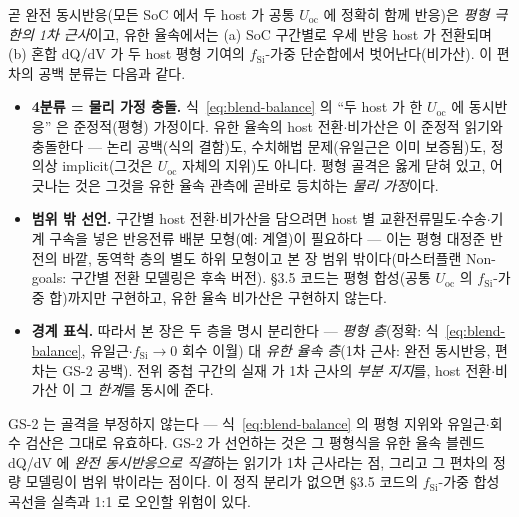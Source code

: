 곧 완전 동시반응(모든 SoC 에서 두 host 가 공통 $U_\mathrm{oc}$ 에 정확히 함께 반응)은 \emph{평형 극한의
1차 근사}이고, 유한 율속에서는 (a) SoC 구간별로 우세 반응 host 가 전환되며 (b) 혼합 dQ/dV 가 두 host
평형 기여의 $f_\mathrm{Si}$-가중 단순합에서 벗어난다(비가산). 이 편차의 공백 분류는 다음과 같다.
\begin{itemize}[leftmargin=1.4em,itemsep=1pt]
\item \textbf{4분류 = 물리 가정 충돌.} 식~\eqref{eq:blend-balance} 의 ``두 host 가 한 $U_\mathrm{oc}$
에 동시반응'' 은 준정적(평형) 가정이다. 유한 율속의 host 전환$\cdot$비가산은 이 준정적 읽기와 충돌한다
--- 논리 공백(식의 결함)도, 수치해법 문제(유일근은 이미 보증됨)도, 정의상 implicit(그것은
$U_\mathrm{oc}$ 자체의 지위)도 아니다. 평형 골격은 옳게 닫혀 있고, 어긋나는 것은 그것을 유한 율속
관측에 곧바로 등치하는 \emph{물리 가정}이다.
\item \textbf{범위 밖 선언.} 구간별 host 전환$\cdot$비가산을 담으려면 host 별 교환전류밀도$\cdot$수송$\cdot$기계
구속을 넣은 반응전류 배분 모형(예: \cite{ai_composite2022} 계열)이 필요하다 --- 이는 평형 대정준 반전의
바깥, 동역학 층의 별도 하위 모형이고 본 장 범위 밖이다(마스터플랜 Non-goals: 구간별 전환 모델링은 후속
버전). §3.5 코드는 평형 합성(공통 $U_\mathrm{oc}$ 의 $f_\mathrm{Si}$-가중 합)까지만 구현하고, 유한 율속
비가산은 구현하지 않는다.
\item \textbf{경계 표식.} 따라서 본 장은 두 층을 명시 분리한다 --- \emph{평형 층}(정확: 식~\eqref{eq:blend-balance},
유일근$\cdot$$f_\mathrm{Si}\to0$ 회수 이월) 대 \emph{유한 율속 층}(1차 근사: 완전 동시반응, 편차는 GS-2
공백). 전위 중첩 구간의 실재\cite{zhan_siox2026} 가 1차 근사의 \emph{부분 지지}를, host 전환$\cdot$비가산
\cite{ai_composite2022,chatzogiannakis_blend2025} 이 그 \emph{한계}를 동시에 준다.
\end{itemize}

\begin{warnbox}
GS-2 는 골격을 부정하지 않는다 --- 식~\eqref{eq:blend-balance} 의 평형 지위와 유일근$\cdot$회수 검산은
그대로 유효하다. GS-2 가 선언하는 것은 그 평형식을 유한 율속 블렌드 dQ/dV 에 \emph{완전 동시반응으로
직결}하는 읽기가 1차 근사라는 점, 그리고 그 편차의 정량 모델링이 범위 밖이라는 점이다. 이 정직 분리가
없으면 §3.5 코드의 $f_\mathrm{Si}$-가중 합성 곡선을 실측과 1:1 로 오인할 위험이 있다.
\end{warnbox}

